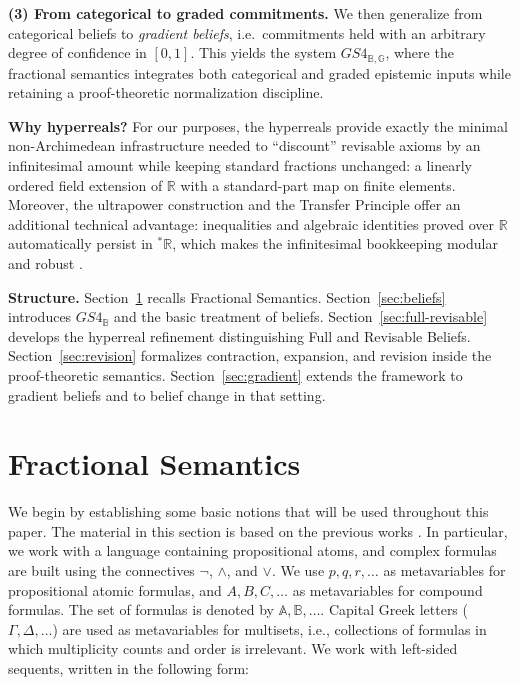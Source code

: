 \documentclass[12pt,a4paper,reqno]{amsart}
\theoremstyle{definition}
\newcommand{\numberset}{\mathbb}
\newcommand{\R}{\numberset{R}}
\newcommand{\B}{\numberset{B}}
\newcommand{\G}{\numberset{G}}
\newcommand{\Rstar}{{}^{\ast}\R}
\begin{document}
\smallskip
\noindent\textbf{(3) From categorical to graded commitments.}
We then generalize from categorical beliefs to \emph{gradient beliefs}, i.e.\ commitments held with an arbitrary degree of confidence in $[0,1]$.  This yields the system $GS4_{\B,\G}$, where the fractional semantics integrates both categorical and graded epistemic inputs while retaining a proof-theoretic normalization discipline.

\smallskip
\noindent\textbf{Why hyperreals?}
For our purposes, the hyperreals provide exactly the minimal non-Archimedean infrastructure needed to ``discount'' revisable axioms by an infinitesimal amount while keeping standard fractions unchanged: a linearly ordered field extension of $\R$ with a standard-part map on finite elements.  Moreover, the ultrapower construction and the Transfer Principle offer an additional technical advantage: inequalities and algebraic identities proved over $\R$ automatically persist in $\Rstar$, which makes the infinitesimal bookkeeping modular and robust \cite{robinson1966,goldblatt1998,keisler1986}.

\smallskip
\noindent\textbf{Structure.}
Section~\ref{sec:frac} recalls Fractional Semantics.
Section~\ref{sec:beliefs} introduces $GS4_\B$ and the basic treatment of beliefs.
Section~\ref{sec:full-revisable} develops the hyperreal refinement distinguishing Full and Revisable Beliefs.
Section~\ref{sec:revision} formalizes contraction, expansion, and revision inside the proof-theoretic semantics.
Section~\ref{sec:gradient} extends the framework to gradient beliefs and to belief change in that setting.


\section{Fractional Semantics}
\label{sec:frac}

We begin by establishing some basic notions that will be used throughout this paper. The material in this section is based on the previous works \cite{piazzapulcini:fractional, piazzapulcini:modal}. In particular, we work with a language containing propositional atoms, and complex formulas are built using the connectives $\neg$, $\wedge$, and $\vee$. We use $p,q,r,\ldots$ as metavariables for propositional atomic formulas, and $A,B,C,\ldots$ as metavariables for compound formulas. The set of formulas is denoted by $\mathbb{A}, \mathbb{B}, \ldots$. Capital Greek letters ($\Gamma, \Delta, \ldots$) are used as metavariables for multisets, i.e., collections of formulas in which multiplicity counts and order is irrelevant. We work with left-sided sequents, written in the following form:
\end{document}
